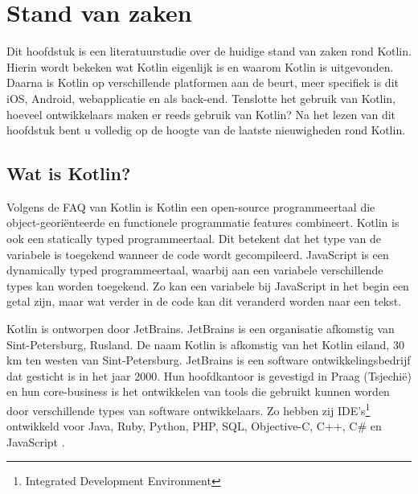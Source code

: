 \chapter{Stand van zaken}
\label{ch:stand-van-zaken}



Dit hoofdstuk is een literatuurstudie over de huidige stand van zaken rond Kotlin. Hierin wordt bekeken wat Kotlin eigenlijk is en waarom Kotlin is uitgevonden. Daarna is Kotlin op verschillende platformen aan de beurt, meer specifiek is dit iOS, Android, webapplicatie en als back-end. Tenslotte het gebruik van Kotlin, hoeveel ontwikkelaars maken er reeds gebruik van Kotlin? Na het lezen van dit hoofdstuk bent u volledig op de hoogte van de laatste nieuwigheden rond Kotlin.

\section{Wat is Kotlin?}
\label{sec:kotlin}
Volgens de FAQ van Kotlin \autocite{JetBrainsFAQ} is Kotlin een open-source programmeertaal die object-georiënteerde en functionele programmatie features combineert. Kotlin is ook een statically typed programmeertaal. Dit betekent dat het type van de variabele is toegekend wanneer de code wordt gecompileerd. JavaScript is een dynamically typed programmeertaal, waarbij aan een variabele verschillende types kan worden toegekend. Zo kan een variabele bij JavaScript in het begin een getal zijn, maar wat verder in de code kan dit veranderd worden naar een tekst.

Kotlin is ontworpen door JetBrains. JetBrains is een organisatie afkomstig van Sint-Petersburg, Rusland. De naam Kotlin is afkomstig van het Kotlin eiland, 30 km ten westen van Sint-Petersburg. JetBrains is een software ontwikkelingsbedrijf dat gesticht is in het jaar 2000. Hun hoofdkantoor is gevestigd in Praag (Tsjechië) en hun core-business is het ontwikkelen van tools die gebruikt kunnen worden door verschillende types van software ontwikkelaars. Zo hebben zij IDE's\footnote{Integrated Development Environment} ontwikkeld voor Java, Ruby, Python, PHP, SQL, Objective-C, C++, C\# en JavaScript \autocite{JetBrainsOverView}.

